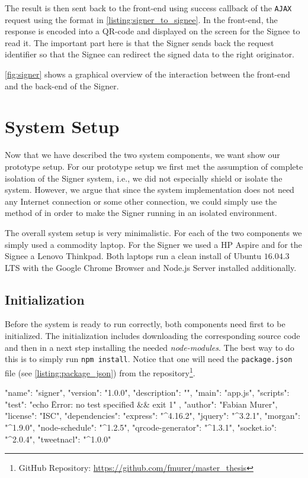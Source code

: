 The result is then sent back to the front-end using success callback of the \texttt{AJAX} request using the format in \autoref{listing:signer_to_signee}. In the front-end, the response is encoded into a QR-code and displayed on the screen for the Signee to read it. The important part here is that the Signer sends back the request identifier so that the Signee can redirect the signed data to the right originator. 

\autoref{fig:signer} shows a graphical overview of the interaction between the front-end and the back-end of the Signer.

\section{System Setup}\label{sec:setup}
Now that we have described the two system components, we want show our prototype setup. For our prototype setup we first met the assumption of complete isolation of the Signer system, i.e., we did not especially shield or isolate the system. However, we argue that since the system implementation does not need any Internet connection or some other connection, we could simply use the method of \cite{castle} in order to make the Signer running in an isolated environment.

The overall system setup is very minimalistic. For each of the two components we simply used a commodity laptop. For the Signer we used a HP Aspire and for the Signee a Lenovo Thinkpad. Both laptops run a clean install of Ubuntu $16.04.3$ LTS with the Google Chrome Browser and Node.js Server installed additionally.

\subsection{Initialization}
Before the system is ready to run correctly, both components need first to be initialized. The initialization includes downloading the corresponding source code and then in a next step installing the needed \emph{node-modules}. The best way to do this is to simply run \texttt{npm install}. Notice that one will need the \texttt{package.json} file (see \autoref{listing:package_json}) from the repository\footnote{GitHub Repository: \url{https://github.com/fmurer/master_thesis}}.

\begin{code}[caption={Example \texttt{package.json} containing the needed node-modules}, label={listing:package_json}]
{
  "name": "signer",
  "version": "1.0.0",
  "description": "",
  "main": "app.js",
  "scripts": {
    "test": "echo \"Error: no test specified\" && exit 1"
  },
  "author": "Fabian Murer",
  "license": "ISC",
  "dependencies": {
    "express": "^4.16.2",
    "jquery": "^3.2.1",
    "morgan": "^1.9.0",
    "node-schedule": "^1.2.5",
    "qrcode-generator": "^1.3.1",
    "socket.io": "^2.0.4",
    "tweetnacl": "^1.0.0"
  }
}
\end{code}

